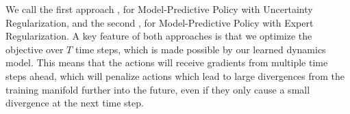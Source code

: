 \documentclass{article} %
\begin{document}
        We call the first approach \modelnamedrop, for Model-Predictive Policy with Uncertainty Regularization, and the second \modelnameil, for Model-Predictive Policy with Expert Regularization.
        A key feature of both approaches is that we optimize the objective over $T$ time steps, which is made possible by our learned dynamics model.
        This means that the actions will receive gradients from multiple time steps ahead, which will penalize actions which lead to large divergences from the training manifold further into the future, even if they only cause a small divergence at the next time step.

\end{document}
